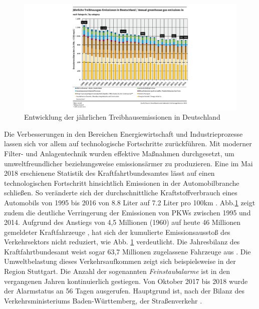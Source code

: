 \begin{figure}[ht]
	\includegraphics[width=\textwidth]{images/jaehrlicheTreibhausEmissionen.png}
	\caption{Entwicklung der jährlichen Treibhausemissionen in Deutschland}
	\label{fig3}
\end{figure}

Die Verbesserungen in den Bereichen Energiewirtschaft und Industrieprozesse lassen sich vor allem auf technologische Fortschritte zurückführen. Mit moderner Filter- und Anlagentechnik wurden effektive Maßnahmen durchgesetzt, um umweltfreundlicher beziehungsweise emissionsärmer zu produzieren. Eine im Mai 2018 erschienene Statistik des Kraftfahrtbundesamtes lässt auf einen technologischen Fortschritt hinsichtlich Emissionen in der Automobilbranche schließen. So veränderte sich der durchschnittliche Kraftstoffverbrauch eines Automobils von 1995 bis 2016 von 8.8 Liter auf 7.2 Liter pro 100km \citep[vgl.][]{Umweltbundesamt.2018}. Abb.\ref{fig3} zeigt zudem die deutliche Verringerung der Emissionen von PKWs zwischen 1995 und 2014. Aufgrund des Anstiegs von 4,5 Millionen (1960) auf heute 46 Millionen gemeldeter Kraftfahrzeuge \citep[vgl.][]{StatistaDasStatistikPortal.2018}, hat sich der kumulierte Emissionsausstoß des Verkehrsektors nicht reduziert, wie Abb. \ref{fig3} verdeutlicht. Die Jahresbilanz des Kraftfahrtbundesamt weist sogar 63,7 Millionen zugelassene Fahrzeuge aus \citep[vgl.][]{KBA.2018}. Die Umweltbelastung dieses Verkehrsaufkommen zeigt sich beispielsweise in der Region Stuttgart. Die Anzahl der sogenannten \emph{Feinstaubalarme} ist in den vergangenen Jahren kontinuierlich gestiegen. Von Oktober 2017 bis 2018 wurde der Alarmstatus an 56 Tagen ausgerufen. Hauptgrund ist, nach der Bilanz des Verkehrsministeriums Baden-Württemberg, der Straßenverkehr \citep[vgl.][]{MinisteriumfurVerkehrBadenWurttemberg.2018}.

